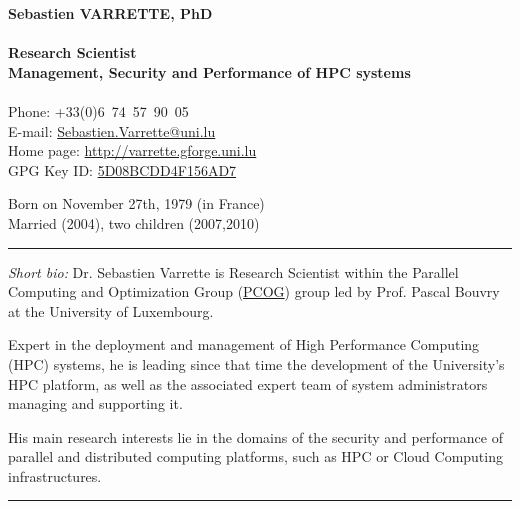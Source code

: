\documentclass{cv}
\begin{document}
\begin{chapeau}
  \begin{adresse}
    {\Large\textbf{Sebastien VARRETTE, PhD}}\\
    \ligne\\
    \textbf{Research Scientist}\\
    \textbf{Management, Security and Performance of HPC systems}\\
    \ligne\\
    Phone: +33(0)6~74~57~90~05\\
    E-mail:    \url{Sebastien.Varrette@uni.lu}\\
    Home page: \url{http://varrette.gforge.uni.lu}\\
    GPG Key ID: \href{https://pgp.mit.edu/pks/lookup?op=vindex&search=0x5D08BCDD4F156AD7}{5D08BCDD4F156AD7}
  \end{adresse}
  \begin{etatcivil}

    Born on November 27th, 1979 (in France)\\
    Married (2004), two children (2007,2010)\\
  \end{etatcivil}
\end{chapeau}
\vspace*{0.5em}
\noindent\rule{\textwidth}{0.4pt}

\emph{Short bio:}
Dr. Sebastien Varrette is Research Scientist within the Parallel Computing and
Optimization Group (\href{http://pcog.uni.lu}{PCOG}) group led by Prof. Pascal
Bouvry  at the University of Luxembourg.

Expert in the deployment and management of High Performance Computing (HPC)
systems, he is leading since that time the development of the University's HPC
platform, as well as the associated expert team of system administrators
managing and supporting it.

His main research interests lie in the domains of the security and performance
of parallel and distributed computing platforms, such as HPC or Cloud Computing
infrastructures.

\noindent\rule{\textwidth}{0.4pt}
\end{document}
